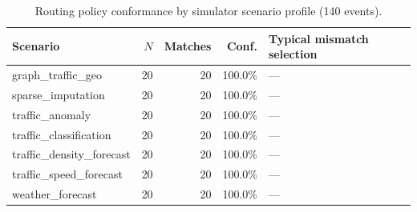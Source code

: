 \begin{table}[H]
  \centering
  \caption{Routing policy conformance by simulator scenario profile (140 events).}
  \label{tab:routing-mismatch}
  \small
  \begin{tabular}{@{}lrrrl@{}}
    \toprule
    Scenario & $N$ & Matches & Conf. & Typical mismatch selection \\
    \midrule
    graph\_traffic\_geo & 20 & 20 & 100.0\% & --- \\
sparse\_imputation & 20 & 20 & 100.0\% & --- \\
traffic\_anomaly & 20 & 20 & 100.0\% & --- \\
traffic\_classification & 20 & 20 & 100.0\% & --- \\
traffic\_density\_forecast & 20 & 20 & 100.0\% & --- \\
traffic\_speed\_forecast & 20 & 20 & 100.0\% & --- \\
weather\_forecast & 20 & 20 & 100.0\% & --- \\
    \bottomrule
  \end{tabular}
\end{table}
